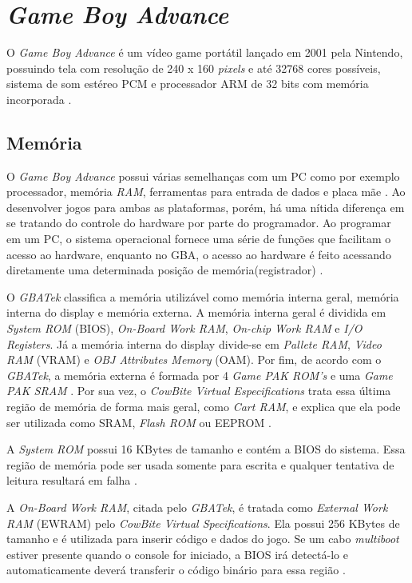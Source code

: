 \section{\textit{Game Boy Advance}}

O \textit{Game Boy Advance} é um vídeo game portátil lançado em 2001 pela Nintendo, possuindo tela com resolução de 240 x 160 \textit{pixels} e até 32768 cores possíveis, sistema de som estéreo PCM e processador ARM de 32 bits com memória incorporada \cite{nintendo}.

\subsection{Memória}

O \textit{Game Boy Advance} possui várias semelhanças com um PC como por exemplo processador, memória \textit{RAM}, ferramentas para entrada de dados e placa mãe \cite{harbour}. Ao desenvolver jogos para ambas as plataformas, porém, há uma nítida diferença em se tratando do controle do hardware por parte do programador. Ao programar em um PC, o sistema operacional fornece uma série de funções que facilitam o acesso ao hardware, enquanto no GBA, o acesso ao hardware é feito acessando diretamente uma determinada posição de memória(registrador) \cite{harbour}.

O \textit{GBATek} classifica a memória utilizável como memória interna geral, memória interna do display e memória externa. A memória interna geral é dividida em \textit{System ROM} (BIOS), \textit{On-Board Work RAM}, \textit{On-chip Work RAM} e \textit{I/O Registers}. Já a memória interna do display divide-se em \textit{Pallete RAM}, \textit{Video RAM} (VRAM) e \textit{OBJ Attributes Memory} (OAM). Por fim, de acordo com o \textit{GBATek}, a memória externa é formada por 4 \textit{Game PAK ROM's} e uma \textit{Game PAK SRAM} \cite{harbour}. Por sua vez, o \textit{CowBite Virtual Especifications} trata essa última região de memória de forma mais geral, como \textit{Cart RAM}, e explica que ela pode ser utilizada como SRAM, \textit{Flash ROM} ou EEPROM \cite{cowbite}.

A \textit{System ROM} possui 16 KBytes de tamanho e contém a BIOS do sistema. Essa região de memória pode ser usada somente para escrita e qualquer tentativa de leitura resultará em falha \cite{cowbite}.

A \textit{On-Board Work RAM}, citada pelo \textit{GBATek}, é tratada como \textit{External Work RAM} (EWRAM) pelo \textit{CowBite Virtual Specifications}. Ela possui 256 KBytes de tamanho e é utilizada para inserir código e dados do jogo. Se um cabo \textit{multiboot} estiver presente quando o console for iniciado, a BIOS irá detectá-lo e automaticamente deverá transferir o código binário para essa região \cite{cowbite}. 

